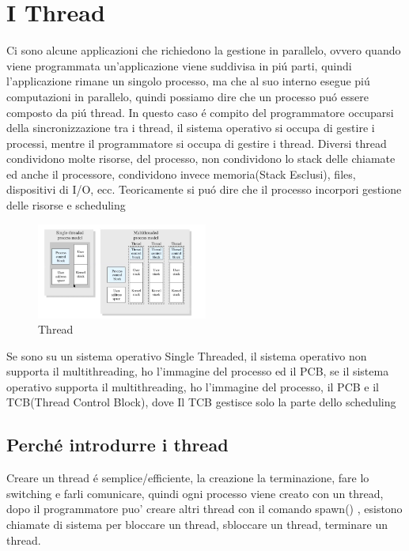 \documentclass[11pt]{article}
\begin{document}
\section{I Thread}
Ci sono alcune applicazioni che richiedono la gestione in parallelo, ovvero quando viene programmata un'applicazione
viene suddivisa in piú parti, quindi l'applicazione rimane un singolo processo, ma che al suo interno esegue
piú computazioni in parallelo, quindi possiamo dire che un processo puó essere composto da piú thread.
In questo caso é compito del programmatore occuparsi della sincronizzazione tra i thread, il sistema operativo
si occupa di gestire i processi, mentre il programmatore si occupa di gestire i thread.
Diversi thread condividono molte risorse, del processo, non condividono lo stack delle chiamate ed anche il processore,
condividono invece memoria(Stack Esclusi), files, dispositivi di I/O, ecc.
Teoricamente si puó dire che il processo incorpori gestione delle risorse e scheduling
\begin{figure}[H]
    \centering
    \includegraphics[width=0.5\textwidth]{immagini/thread1}
    \caption{Thread}
\end{figure}
Se sono su un sistema operativo Single Threaded, il sistema operativo non supporta il multithreading, ho l'immagine del processo
ed il PCB, se il sistema operativo supporta il multithreading, ho l'immagine del processo, il PCB e il TCB(Thread Control Block),
dove Il TCB gestisce solo la parte dello scheduling
\subsection{Perché introdurre i thread}
Creare un thread é semplice/efficiente, la creazione la terminazione, fare lo switching e farli comunicare,
quindi ogni processo viene creato con un thread, dopo il programmatore puo' creare altri thread con il comando spawn()
, esistono chiamate di sistema per bloccare un thread, sbloccare un thread, terminare un thread.
\end{document}
